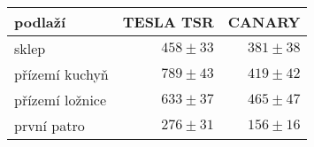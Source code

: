 \begin{tabular}{lrr}
\toprule
podlaží & TESLA TSR & CANARY \\
\midrule
sklep          & $458\pm33$ & $381\pm38$\\
přízemí kuchyň & $789\pm43$ & $419\pm42$\\
přízemí ložnice& $633\pm37$ & $465\pm47$\\
první patro    & $276\pm31$ & $156\pm16$\\
\bottomrule
\end{tabular}
